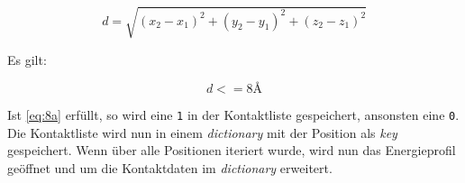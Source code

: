 \begin{equation}
    d=\sqrt{(x_2-x_1)^2+(y_2-y_1)^2+(z_2-z_1)^2}
    \label{eq:abstand}
\end{equation}

Es gilt:

\begin{equation}
    d <= 8\text{\AA}
    \label{eq:8a}
\end{equation}

Ist \ref{eq:8a} erfüllt, so wird eine \texttt{1} in der Kontaktliste gespeichert, ansonsten eine \texttt{0}. Die Kontaktliste wird nun in einem \emph{dictionary} mit der Position als \emph{key} gespeichert. Wenn über alle Positionen iteriert wurde, wird nun das Energieprofil geöffnet und um die Kontaktdaten im \emph{dictionary} erweitert.




